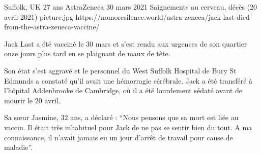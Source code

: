 {Suffolk, UK}
{27 ans}
{AstraZeneca}
{30 mars 2021}
{Saignements au cerveau, décès (20 avril 2021)}
{picture.jpg}
{https://nomoresilence.world/astra-zeneca/jack-last-died-from-the-astra-zeneca-vaccine/}
{

Jack Last a été vacciné le 30 mars et s'est rendu aux urgences de son quartier
onze jours plus tard en se plaignant de maux de tête.

Son état s'est aggravé et le personnel du West Suffolk Hospital de Bury St
Edmunds a constaté qu'il avait une hémorragie cérébrale. Jack a été transféré à
l'hôpital Addenbrooke de Cambridge, où il a été lourdement sédaté avant de
mourir le 20 avril.

Sa sœur Jasmine, 32 ans, a déclaré : “Nous pensons que sa mort est liée au
vaccin. Il était très inhabituel pour Jack de ne pas se sentir bien du tout. A
ma connaissance, il n'avait jamais eu un jour d'arrêt de travail pour cause de
maladie”.

}
